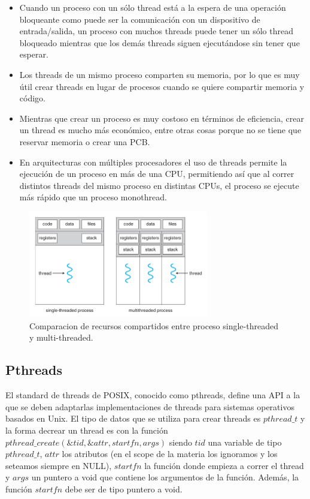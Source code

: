 \documentclass{article}
\begin{document}
\begin{itemize}
\item Cuando un proceso con un s\'olo thread est\'a a la espera de una operaci\'on bloqueante como puede ser la comunicaci\'on con un dispositivo de entrada/salida, un proceso con muchos threads puede tener un s\'olo thread bloqueado mientras que los dem\'as threads siguen ejecut\'andose sin tener que esperar.
\item Los threads de un mismo proceso comparten su memoria, por lo que es muy \'util crear threads en lugar de procesos cuando se quiere compartir memoria y c\'odigo.
\item Mientras que crear un proceso es muy costoso en t\'erminos de eficiencia, crear un thread es mucho m\'as econ\'omico, entre otras cosas porque no se tiene que reservar memoria o crear una PCB.
\item En arquitecturas con m\'ultiples procesadores el uso de threads permite la ejecuci\'on de un proceso en m\'as de una CPU, permitiendo as\'i que al correr distintos threads del mismo proceso en distintas CPUs, el proceso se ejecute m\'as r\'apido que un proceso monothread.
\end{itemize}

\begin{figure}[H]
    \centering
    \includegraphics[width=0.7\textwidth]{imgs/process_threads.png}
    \caption{Comparacion de recursos compartidos entre proceso single-threaded y multi-threaded.}
    \label{fig:process_threads}
\end{figure}

\subsection{Pthreads}

El standard de threads de POSIX, conocido como pthreads, define una API a la que se deben adaptarlas implementaciones de threads para sistemas operativos basados en Unix. El tipo de datos que se utiliza para crear threads es $pthread\_t$ y la forma decrear un thread es con la funci\'on $pthread\_create(\&tid,\&attr,startfn,args)$ siendo $tid$ una variable de tipo $pthread\_t$, $attr$ los atributos (en el scope de la materia los ignoramos y los seteamos siempre en NULL), $startfn$ la funci\'on donde empieza a correr el thread y $args$ un puntero a void que contiene los argumentos de la funci\'on. Adem\'as, la funci\'on $startfn$ debe ser de tipo puntero a void.
\end{document}
